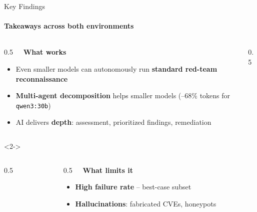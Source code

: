 \begin{frame}{Key Findings}
    \framesubtitle{Takeaways across both environments}
    \begin{columns}[T,onlytextwidth]
        \begin{column}{0.5\textwidth}
            \textbf{\faCheckCircle~~What works}
            \begin{itemize}
                \item \scriptsize Even smaller models can autonomously run \textbf{standard red-team reconnaissance}
                \item \scriptsize \textbf{Multi-agent decomposition} helps smaller models (--68\% tokens for \texttt{qwen3:30b})
                \item \scriptsize AI delivers \textbf{depth}: assessment, prioritized findings, remediation
            \end{itemize}
        \end{column}
        \begin{column}{0.5\textwidth}
        \end{column}
    \end{columns}
    \vspace{0.5em}
    \begin{onlyenv}<2->
        \begin{columns}[T,onlytextwidth]
            \begin{column}{0.5\textwidth}
            \end{column}
            \begin{column}{0.5\textwidth}
                \textbf{\faExclamationTriangle~~What limits it}
                \begin{itemize}
                    \item \scriptsize \textbf{High failure rate} -- best-case subset
                    \item \scriptsize \textbf{Hallucinations}: fabricated CVEs, honeypots
                \end{itemize}
            \end{column}
        \end{columns}
    \end{onlyenv}
\end{frame}

